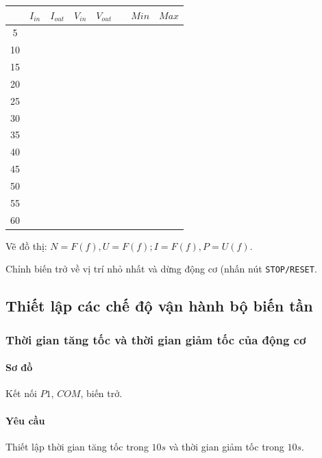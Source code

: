 \documentclass[13pt,a4paper]{extarticle}
\begin{document}
\begin{list}{--}{}
\begin{longtable}{|c|c|c|c|c|c|c|c|}
& $I_{in}$ & $I_{out}$ & $V_{in}$ & $V_{out}$  & & $Min$ & $Max$ \\ \hline
5 &  &  &  &   & &  &  \\ \hline
10 &  &  &  &   & &  &  \\ \hline
15 &  &  &  &   & &  &  \\ \hline
20 &  &  &  &   & &  &  \\ \hline
25 &  &  &  &   & &  &  \\ \hline
30 &  &  &  &   & &  &  \\ \hline
35 &  &  &  &   & &  &  \\ \hline
40 &  &  &  &   & &  &  \\ \hline
45 &  &  &  &   & &  &  \\ \hline
50 &  &  &  &   & &  &  \\ \hline
55 &  &  &  &   & &  &  \\ \hline
60 &  &  &  &   & &  &  \\ \hline
\end{longtable}
\item Vẽ đồ thị: $N = F(f), U = F(f); I = F(f), P = U(f)$.
\item Chỉnh biến trở về vị trí nhỏ nhất và dừng động cơ (nhấn nút \verb|STOP/RESET|.
\end{list}
\subsection{Thiết lập các chế độ vận hành bộ biến tần}
\subsubsection{Thời gian tăng tốc và thời gian giảm tốc của động cơ}
\paragraph{Sơ đồ}Kết nối $P1$, $COM$, biến trở.
\paragraph{Yêu cầu}Thiết lập thời gian tăng tốc trong $10s$ và thời gian giảm tốc trong $10s$.
\end{document}
